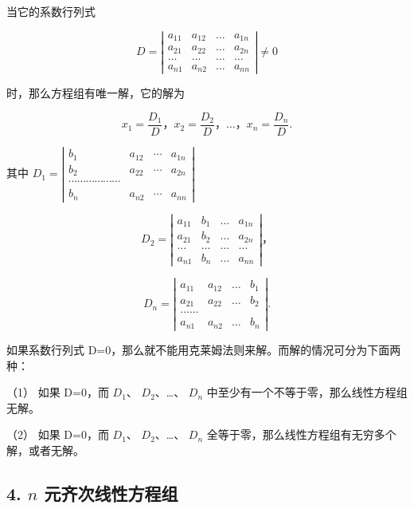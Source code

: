 当它的系数行列式

\[
D = \left| \begin{array}{cccc} a _ {11} & a _ {12} & \dots & a _ {1 n} \\ a _ {21} & a _ {22} & \dots & a _ {2 n} \\ \dots & \dots & \dots & \dots \\ a _ {n 1} & a _ {n 2} & \dots & a _ {n n} \end{array} \right| \neq 0
\]

时，那么方程组有唯一解，它的解为

\[
x _ {1} = \frac {D _ {1}}{D}\text{，} x _ {2} = \frac {D _ {2}}{D}\text{，} \dots \text{，} x _ {n} = \frac {D _ {n}}{D}.
\]

其中
\(D_{1}=\left|\begin{matrix}b_{1}&a_{12}&\cdots&a_{1n}\\ b_{2}&a_{22}&\cdots&a_{2n}\\ \cdots\cdots\cdots\cdots\cdots\cdots\\ b_{n}&a_{n2}&\cdots&a_{nn}\end{matrix}\right|\)

\[
D _ {2} = \left| \begin{array}{cccc} a _ {11} & b _ {1} & \dots & a _ {1 n} \\ a _ {21} & b _ {2} & \dots & a _ {2 n} \\ \dots & \dots & \dots & \dots \\ a _ {n 1} & b _ {n} & \dots & a _ {n n} \end{array} \right|\text{，}
\]

\[
D _ {n} = \left| \begin{array}{cccc} a _ {11} & a _ {12} & \dots & b _ {1} \\ a _ {21} & a _ {22} & \dots & b _ {2} \\ \dots \dots \\ a _ {n 1} & a _ {n 2} & \dots & b _ {n} \end{array} \right|.
\]

如果系数行列式
D=0，那么就不能用克莱姆法则来解。而解的情况可分为下面两种：

（1） 如果 D=0，而 \(D_{1}\)、 \(D_{2}\)、\ldots、 \(D_{n}\)
中至少有一个不等于零，那么线性方程组无解。

（2） 如果 D=0，而 \(D_{1}\)、 \(D_{2}\)、\ldots、 \(D_{n}\)
全等于零，那么线性方程组有无穷多个解，或者无解。

\subsection{\texorpdfstring{4. \(n\) 元齐次线性方程组}{4. n 元齐次线性方程组}}\label{n-ux5143ux9f50ux6b21ux7ebfux6027ux65b9ux7a0bux7ec4}

